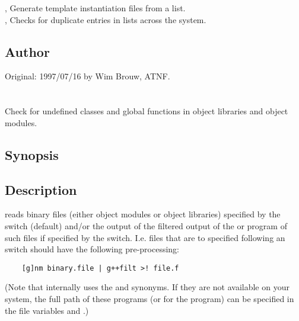 , Generate template instantiation files from a list.\\
, Checks for duplicate entries in  lists
   across the system.

\subsection*{Author}

Original: 1997/07/16 by Wim Brouw, ATNF.


\newpage
\section{}
\label{used}

Check for undefined classes and global functions in object libraries and
object modules.

\subsection*{Synopsis}

\begin{synopsis}
\end{synopsis}

\subsection*{Description}

 reads binary files (either object modules or object
libraries) specified by the  switch (default) and/or the output of the
 filtered output of the  or  
program of such files if specified by the  switch. I.e. files that
are to specified following an  switch should have the following
pre-processing: 
\begin{verbatim}
	[g]nm binary.file | g++filt >! file.f
\end{verbatim}
(Note that internally  uses the  and 
synonyms. If they are not available on your system, the full path of these
programs (or for the  program) can be specified in the 
file variables  and .)

